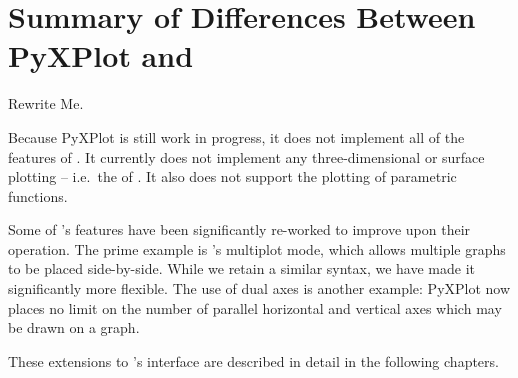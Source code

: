 %
%
%
%
%



\chapter{Summary of Differences Between PyXPlot and \gnuplot}
\label{ch:gnuplot_diffs}

Rewrite Me.

Because PyXPlot is still work in progress, it does not implement all of the
features of \gnuplot. It currently does not implement any three-dimensional or
surface plotting -- i.e.\ the  of \gnuplot. It also does not
support the plotting of parametric functions.

Some of \gnuplot's features have been significantly re-worked to improve upon
their operation. The prime example is \gnuplot's multiplot mode, which allows
multiple graphs to be placed side-by-side. While we retain a similar syntax, we
have made it significantly more flexible. The use of dual axes is another
example: PyXPlot now places no limit on the number of parallel horizontal and
vertical axes which may be drawn on a graph.

These extensions to \gnuplot's interface are described in detail in the
following chapters.

